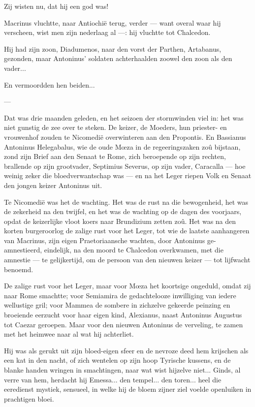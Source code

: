 \documentclass[a4paper, 12pt, oneside, dutch]{article}
\begin{document}
Zij wisten nu, dat hij een god was!

Macrinus vluchtte, naar Antiochië terug, verder --- want overal waar hij verscheen, wist men zijn nederlaag al ---: hij vluchtte tot Chalcedon.

Hij had zijn zoon, Diadumenos, naar den vorst der Parthen, Artabanus, gezonden, maar Antoninus' soldaten achterhaalden zoowel den zoon als den vader...

En vermoordden hen beiden...

---

Dat was drie maanden geleden, en het seizoen der stormwinden viel in: het was niet gunstig de zee over te steken. De keizer, de Moeders, hun priester- en vrouwenhof zouden te Nicomedië overwinteren aan den Propontis. En Bassianus Antoninus Helegabalus, wie de oude Mœza in de regeeringszaken zoû bijstaan, zond zijn Brief aan den Senaat te Rome, zich beroepende op zijn rechten, brallende op zijn grootvader, Septimius Severus, op zijn vader, Caracalla --- hoe weinig zeker die bloedverwantschap was --- en na het Leger riepen Volk en Senaat den jongen keizer Antoninus uit.

Te Nicomedië was het de wachting. Het was de rust na die bewogenheid, het was de zekerheid na den twijfel, en het was de wachting op de dagen des voorjaars, opdat de keizerlijke vloot koers naar Brundizium zetten zoû. Het was na den korten burgeroorlog de zalige rust voor het Leger, tot wie de laatste aanhangeren van Macrinus, zijn eigen Praetoriaansche wachten, door Antoninus ge-amnestieerd, eindelijk, na den moord te Chalcedon overkwamen, met die amnestie --- te gelijkertijd, om de persoon van den nieuwen keizer --- tot lijfwacht benoemd.

De zalige rust voor het Leger, maar voor Mœza het koortsige ongeduld, omdat zij naar Rome smachtte; voor Semiamira de gedachtelooze inwilliging van iedere wellustige gril; voor Mammea de sombere in zichzelve gekeerde peinzing en broeiende eerzucht voor haar eigen kind, Alexianus, naast Antoninus Augustus tot Caezar geroepen. Maar voor den nieuwen Antoninus de verveling, te zamen met het heimwee naar al wat hij achterliet.

Hij was als gerukt uit zijn bloed-eigen sfeer en de nevroze deed hem krijschen als een kat in den nacht, of zich wentelen op zijn hoop Tyrische kussens, en de blanke handen wringen in smachtingen, naar wat wist hijzelve niet... Ginds, al verre van hem, herdacht hij Emessa... den tempel... den toren... heel die eeredienst mystiek, sensueel, in welke hij de bloem zijner ziel voelde openluiken in prachtigen bloei.
\end{document}
